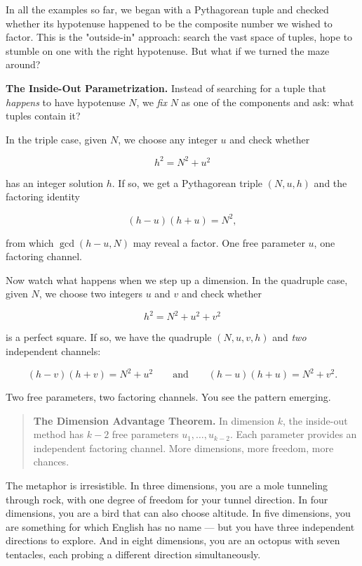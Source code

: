 \documentclass[11pt,openany]{book}
\theoremstyle{definition}
\theoremstyle{plain}
\theoremstyle{remark}
\begin{document}
In all the examples so far, we began with a Pythagorean tuple and checked whether its hypotenuse happened to be the composite number we wished to factor. This is the "outside-in" approach: search the vast space of tuples, hope to stumble on one with the right hypotenuse. But what if we turned the maze around?

\textbf{The Inside-Out Parametrization.} Instead of searching for a tuple that \textit{happens} to have hypotenuse $N$, we \textit{fix} $N$ as one of the components and ask: what tuples contain it?

In the triple case, given $N$, we choose any integer $u$ and check whether

$$h^2 = N^2 + u^2$$

has an integer solution $h$. If so, we get a Pythagorean triple $(N, u, h)$ and the factoring identity

$$(h - u)(h + u) = N^2,$$

from which $\gcd(h - u, N)$ may reveal a factor. One free parameter $u$, one factoring channel.

Now watch what happens when we step up a dimension. In the quadruple case, given $N$, we choose two integers $u$ and $v$ and check whether

$$h^2 = N^2 + u^2 + v^2$$

is a perfect square. If so, we have the quadruple $(N, u, v, h)$ and \textit{two} independent channels:

$$(h - v)(h + v) = N^2 + u^2 \qquad \text{and} \qquad (h - u)(h + u) = N^2 + v^2.$$

Two free parameters, two factoring channels. You see the pattern emerging.

\begin{quote}
\textbf{The Dimension Advantage Theorem.} In dimension $k$, the inside-out method has $k - 2$ free parameters $u_1, \ldots, u_{k-2}$. Each parameter provides an independent factoring channel. More dimensions, more freedom, more chances.
\end{quote}


The metaphor is irresistible. In three dimensions, you are a mole tunneling through rock, with one degree of freedom for your tunnel direction. In four dimensions, you are a bird that can also choose altitude. In five dimensions, you are something for which English has no name — but you have three independent directions to explore. And in eight dimensions, you are an octopus with seven tentacles, each probing a different direction simultaneously.
\end{document}
